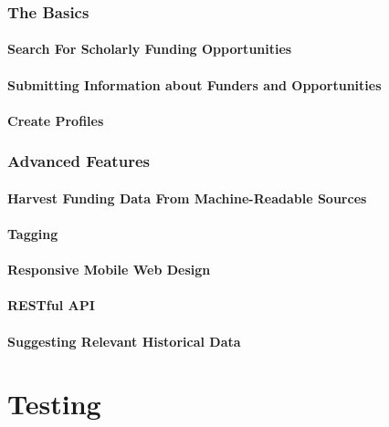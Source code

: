 \subsection{The Basics}
\subsubsection{Search For Scholarly Funding Opportunities}
\subsubsection{Submitting Information about Funders and Opportunities}
\subsubsection{Create Profiles}
\subsection{Advanced Features}
\subsubsection{Harvest Funding Data From Machine-Readable Sources}
\subsubsection{Tagging}
\subsubsection{Responsive Mobile Web Design}
\subsubsection{RESTful API}
\subsubsection{Suggesting Relevant Historical Data}
\chapter{Testing}

